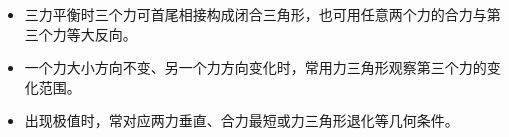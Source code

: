\begin{casetypebox}[title={\strut\textcolor{white}{\bfseries 常见题型：三个力动态平衡}}]
\begin{itemize}[leftmargin=1.5em]
  \item 三力平衡时三个力可首尾相接构成闭合三角形，也可用任意两个力的合力与第三个力等大反向。
  \item 一个力大小方向不变、另一个力方向变化时，常用力三角形观察第三个力的变化范围。
  \item 出现极值时，常对应两力垂直、合力最短或力三角形退化等几何条件。
\end{itemize}
\end{casetypebox}
